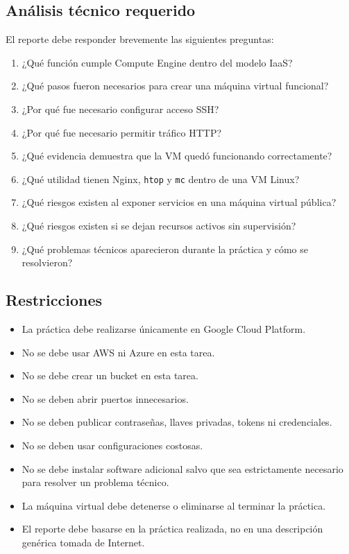 \documentclass[
  coursetitle={Cómputo Nube y Tecnologías Emergentes},
  coursehours={96},
  coursedate={Verano 2026},
  doctype={Tarea 2},
  otherlangs={english,french},
  authorname={Lázaro},
  authorsurname={Bustio-Martínez},
  authortitle={PhD},
  role={Profesor Investigador},
  email={lbustio@inaoe.mx},
  phone={5559504000},
  ext={7459},
  institution={Instituto Nacional de Astrofísica, Óptica y Electrónica (INAOE)},
  department={Maestría en Ciencias en Tecnologías de Seguridad},
  address={Luis Enrique Erro 1, Sta. Ma. Tonantzintla, San Andrés Cholula, CP 72840, Puebla, México},
  margin={0.5in}
]{../../../lbustio_lecture_notes}
\begin{document}
\subsection{Análisis técnico requerido}
\label{sec:tarea2-analisis}

El reporte debe responder brevemente las siguientes preguntas:

\begin{enumerate}
  \item ¿Qué función cumple Compute Engine dentro del modelo IaaS?
  \item ¿Qué pasos fueron necesarios para crear una máquina virtual funcional?
  \item ¿Por qué fue necesario configurar acceso SSH?
  \item ¿Por qué fue necesario permitir tráfico HTTP?
  \item ¿Qué evidencia demuestra que la VM quedó funcionando correctamente?
  \item ¿Qué utilidad tienen Nginx, \texttt{htop} y \texttt{mc} dentro de una VM Linux?
  \item ¿Qué riesgos existen al exponer servicios en una máquina virtual pública?
  \item ¿Qué riesgos existen si se dejan recursos activos sin supervisión?
  \item ¿Qué problemas técnicos aparecieron durante la práctica y cómo se resolvieron?
\end{enumerate}

\subsection{Restricciones}
\label{sec:tarea2-restricciones}

\begin{itemize}
  \item La práctica debe realizarse únicamente en Google Cloud Platform.
  \item No se debe usar AWS ni Azure en esta tarea.
  \item No se debe crear un bucket en esta tarea.
  \item No se deben abrir puertos innecesarios.
  \item No se deben publicar contraseñas, llaves privadas, tokens ni credenciales.
  \item No se deben usar configuraciones costosas.
  \item No se debe instalar software adicional salvo que sea estrictamente necesario para resolver un problema técnico.
  \item La máquina virtual debe detenerse o eliminarse al terminar la práctica.
  \item El reporte debe basarse en la práctica realizada, no en una descripción genérica tomada de Internet.
\end{itemize}
\end{document}
